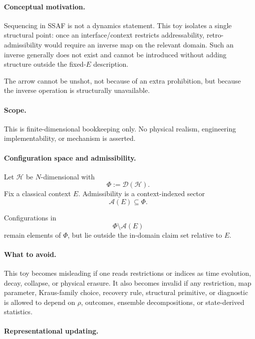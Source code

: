 \documentclass[aps,prx,onecolumn,11pt]{revtex4-2}
\theoremstyle{plain}
\theoremstyle{definition}
\theoremstyle{remark}
\begin{document}
\paragraph{Conceptual motivation.}

Sequencing in SSAF is not a dynamics statement. This toy isolates a
single structural point: once an interface/context restricts
addressability, retro-admissibility would require an inverse map on the
relevant domain. Such an inverse generally does not exist and cannot be
introduced without adding structure outside the fixed-\(E\) description.

The arrow cannot be unshot, not because of an extra prohibition, but
because the inverse operation is structurally unavailable.

\paragraph{Scope.}

This is finite-dimensional bookkeeping only. No physical realism,
engineering implementability, or mechanism is asserted.

\paragraph{Configuration space and admissibility.}

Let \(\mathcal H\) be \(N\)-dimensional with
\[
\Phi:=\mathcal D(\mathcal H).
\]
Fix a classical context \(E\). Admissibility is a context-indexed sector
\[
\mathcal A(E)\subseteq\Phi.
\]

Configurations in
\[
\Phi\setminus\mathcal A(E)
\]
remain elements of \(\Phi\), but lie outside the in-domain claim set
relative to \(E\).

\paragraph{What to avoid.}

This toy becomes misleading if one reads restrictions or indices as
time evolution, decay, collapse, or physical erasure. It also becomes
invalid if any restriction, map parameter, Kraus-family choice,
recovery rule, structural primitive, or diagnostic is allowed to depend
on \(\rho\), outcomes, ensemble decompositions, or state-derived
statistics.

\paragraph{Representational updating.}
\end{document}
